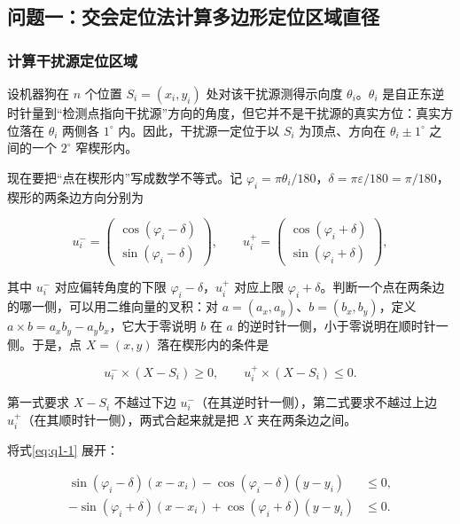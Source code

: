 \subsection{问题一：交会定位法计算多边形定位区域直径}\label{sec:q1}
\subsubsection{计算干扰源定位区域}\label{sec:q1-1}

设机器狗在 $n$ 个位置 $S_i=(x_i,y_i)$ 处对该干扰源测得示向度 $\theta_i$。$\theta_i$ 是自正东逆时针量到“检测点指向干扰源”方向的角度，但它并不是干扰源的真实方位：真实方位落在 $\theta_i$ 两侧各 $1^\circ$ 内。因此，干扰源一定位于以 $S_i$ 为顶点、方向在 $\theta_i\pm1^\circ$ 之间的一个 $2^\circ$ 窄楔形内。

现在要把“点在楔形内”写成数学不等式。记 $\varphi_i=\pi\theta_i/180$，$\delta=\pi\varepsilon/180=\pi/180$，楔形的两条边方向分别为

\[
u_i^-=\begin{pmatrix}\cos(\varphi_i-\delta)\\ \sin(\varphi_i-\delta)\end{pmatrix},\qquad
u_i^+=\begin{pmatrix}\cos(\varphi_i+\delta)\\ \sin(\varphi_i+\delta)\end{pmatrix},
\]

其中 $u_i^-$ 对应偏转角度的下限 $\varphi_i-\delta$，$u_i^+$ 对应上限 $\varphi_i+\delta$。判断一个点在两条边的哪一侧，可以用二维向量的叉积：对 $a=(a_x,a_y)$、$b=(b_x,b_y)$，定义 $a\times b=a_xb_y-a_yb_x$，它大于零说明 $b$ 在 $a$ 的逆时针一侧，小于零说明在顺时针一侧。于是，点 $X=(x,y)$ 落在楔形内的条件是

\begin{equation}\label{eq:q1-1}
u_i^-\times(X-S_i)\ge 0,\qquad u_i^+\times(X-S_i)\le 0.
\end{equation}

第一式要求 $X-S_i$ 不越过下边 $u_i^-$（在其逆时针一侧），第二式要求不越过上边 $u_i^+$（在其顺时针一侧），两式合起来就是把 $X$ 夹在两条边之间。

将式\eqref{eq:q1-1} 展开：

\begin{equation}\label{eq:q1-2}
\begin{aligned}
\sin(\varphi_i-\delta)(x-x_i)-\cos(\varphi_i-\delta)(y-y_i)&\le 0,\\
-\sin(\varphi_i+\delta)(x-x_i)+\cos(\varphi_i+\delta)(y-y_i)&\le 0.
\end{aligned}
\end{equation}

